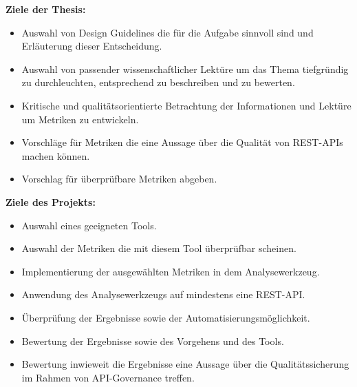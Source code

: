 \documentclass[../../expose]{subfiles}
\begin{document}
\textbf{Ziele der Thesis:}
\begin{itemize}
\item Auswahl von Design Guidelines die für die Aufgabe sinnvoll sind und Erläuterung dieser Entscheidung.
\item Auswahl von passender wissenschaftlicher Lektüre um das Thema tiefgründig zu durchleuchten, entsprechend zu beschreiben und zu bewerten.
\item Kritische und qualitätsorientierte Betrachtung der Informationen und Lektüre um Metriken zu entwickeln.
\item Vorschläge für Metriken die eine Aussage über die Qualität von REST-APIs machen können.
\item Vorschlag für überprüfbare Metriken abgeben.
\end{itemize} 



\textbf{Ziele des Projekts:}
\begin{itemize}
\item Auswahl eines geeigneten Tools.
\item Auswahl der Metriken die mit diesem Tool überprüfbar scheinen.
\item Implementierung der ausgewählten Metriken in dem Analysewerkzeug.
\item Anwendung des Analysewerkzeugs auf mindestens eine REST-API.
\item Überprüfung der Ergebnisse sowie der Automatisierungsmöglichkeit.
\item Bewertung der Ergebnisse sowie des Vorgehens und des Tools.
\item Bewertung inwieweit die Ergebnisse eine Aussage über die Qualitätssicherung im Rahmen von API-Governance treffen. \newline
\end{itemize}
\end{document}

